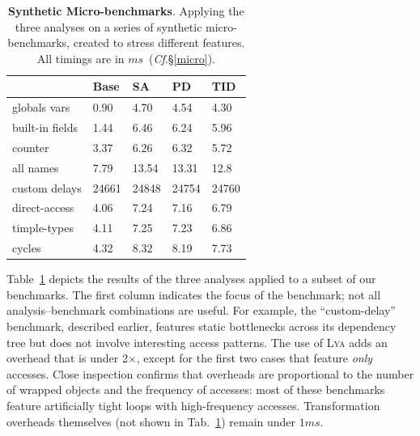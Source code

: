\documentclass[letterpaper,twocolumn,10pt]{article}
\newcommand{\cf}[1]{(\emph{Cf}.\S\ref{#1})}
\newcommand{\sys}{{\scshape Lya}\xspace}
\begin{document}
\begin{table}[t]
\center
\footnotesize
\setlength\tabcolsep{3pt}
\caption{
  \footnotesize{
    \textbf{Synthetic Micro-benchmarks}.
		Applying the three analyses on a series of synthetic micro-benchmarks, created to stress different features.
    All timings are in $ms$~\cf{micro}.
  }
}
\begin{tabular*}{\columnwidth}{l @{\extracolsep{\fill}} lll l}
\toprule
	               &   Base    &  SA     & PD      &  TID    \\
\midrule
globals vars     &   0.90    &  4.70   &  4.54   &  4.30   \\
built-in fields  &   1.44    &  6.46   &  6.24   &  5.96   \\
counter          &   3.37    &  6.26   &  6.32   &  5.72   \\
all names        &   7.79    &  13.54  &  13.31  &  12.8   \\
custom delays    &   24661   &  24848  &  24754  &  24760  \\
direct-access    &   4.06    &  7.24   &  7.16   &  6.79   \\
timple-types     &   4.11    &  7.25   &  7.23   &  6.86   \\
cycles           &   4.32    &  8.32   &  8.19   &  7.73   \\
\bottomrule
\end{tabular*}
\label{tab:synthetic}
\vspace{-5mm}
\end{table}

Table~\ref{tab:synthetic} depicts the results of the three analyses applied to a subset of our benchmarks.
The first column indicates the focus of the benchmark; not all analysis--benchmark combinations are useful.
For example, the ``custom-delay'' benchmark, described earlier, features static bottlenecks across its dependency tree but does not involve interesting access patterns.
The use of \sys adds an overhead that is under 2$\times$, except for the first two cases that feature \emph{only} accesses.
Close inspection confirms that overheads are proportional to the number of wrapped objects and the frequency of accesses:
  most of these benchmarks feature artificially tight loops with high-frequency accesses.
Transformation overheads themselves (not shown in Tab.~\ref{tab:synthetic}) remain under $1ms$.
\end{document}
